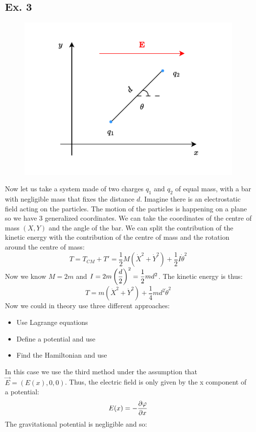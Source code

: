 \subsection{Ex. 3}
\begin{figure}[H]
  \centering
  \includegraphics[width=0.5\linewidth]{res/svg/dipole.drawio}
\end{figure}
Now let us take a system made of two charges $q_1$ and $q_2$ of equal mass, with a bar with negligible mass that fixes the distance $d$. Imagine there is an electrostatic field acting on the particles. The motion of the particles is happening on a plane so we have 3 generalized coordinates. We can take the coordinates of the centre of mass $(X, Y)$ and the angle of the bar. We can split the contribution of the kinetic energy with the contribution of the centre of mass and the rotation around the centre of mass:
\begin{equation}
  T = T_{CM} + T' = \dfrac{1}{2}M(\dot{X}^2+\dot{Y}^2) + \dfrac{1}{2}I\dot{\theta}^2
\end{equation}
Now we know $M = 2m$ and $I = 2m\left(\dfrac{d}{2}\right)^2 = \dfrac{1}{2}md^2$. The kinetic energy is thus:
\begin{equation}
  T = m(\dot{X}^2+\dot{Y}^2) + \dfrac{1}{4}md^2\dot{\theta}^2
\end{equation}
Now we could in theory use three different approaches:
\begin{itemize}
  \item Use Lagrange equations
  \item Define a potential and use \eleref
  \item Find the Hamiltonian and use \hamiltonref
\end{itemize}
In this case we use the third method under the assumption that $\vec{E} = (E(x), 0, 0)$. Thus, the electric field is only given by the x component of a potential:
\begin{equation}
  E(x) = -\pdv{\potE}{x}
\end{equation}
The gravitational potential is negligible and so:
